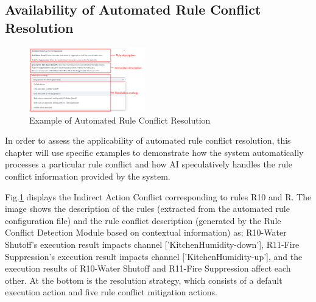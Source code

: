 \subsection{Availability of Automated Rule Conflict Resolution}

\begin{figure}[htbp]
	\centering
	\includegraphics[width=0.45\textwidth]{figure/resolution_example.png}
	\caption{Example of Automated Rule Conflict Resolution}
	\label{example_resolution}
\end{figure}

In order to assess the applicability of automated rule conflict resolution, this chapter will use specific examples to demonstrate how the system automatically processes a particular rule conflict and how AI speculatively handles the rule conflict information provided by the system.

Fig.\ref{example_resolution} displays the Indirect Action Conflict corresponding to rules R10 and R. The image shows the description of the rules (extracted from the automated rule configuration file) and the rule conflict description (generated by the Rule Conflict Detection Module based on contextual information) as: R10-Water Shutoff's execution result impacts channel ['KitchenHumidity-down'], R11-Fire Suppression's execution result impacts channel ['KitchenHumidity-up'], and the execution results of R10-Water Shutoff and R11-Fire Suppression affect each other. At the bottom is the resolution strategy, which consists of a default execution action and five rule conflict mitigation actions.

